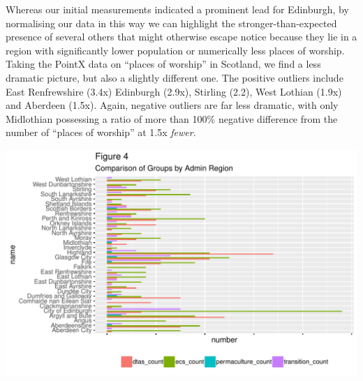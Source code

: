 \documentclass[11pt,]{article}
\begin{document}
Whereas our initial measurements indicated a prominent lead for
Edinburgh, by normalising our data in this way we can highlight the
stronger-than-expected presence of several others that might otherwise
escape notice because they lie in a region with significantly lower
population or numerically less places of worship. Taking the PointX data
on ``places of worship'' in Scotland, we find a less dramatic picture,
but also a slightly different one. The positive outliers include East
Renfrewshire (3.4x) Edinburgh (2.9x), Stirling (2.2), West Lothian
(1.9x) and Aberdeen (1.5x). Again, negative outliers are far less
dramatic, with only Midlothian possessing a ratio of more than 100\%
negative difference from the number of ``places of worship'' at 1.5x
\emph{fewer}.

\includegraphics{figures/create_admin_barplot-1.pdf}
\end{document}
